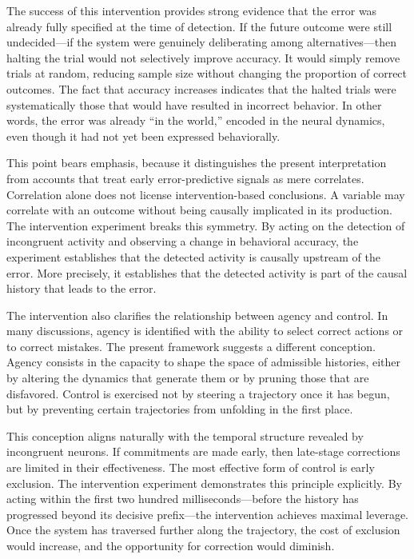 \documentclass[11pt]{article}
\begin{document}
The success of this intervention provides strong evidence that the error was already fully specified at the time of detection. If the future outcome were still undecided—if the system were genuinely deliberating among alternatives—then halting the trial would not selectively improve accuracy. It would simply remove trials at random, reducing sample size without changing the proportion of correct outcomes. The fact that accuracy increases indicates that the halted trials were systematically those that would have resulted in incorrect behavior. In other words, the error was already “in the world,” encoded in the neural dynamics, even though it had not yet been expressed behaviorally.

This point bears emphasis, because it distinguishes the present interpretation from accounts that treat early error-predictive signals as mere correlates. Correlation alone does not license intervention-based conclusions. A variable may correlate with an outcome without being causally implicated in its production. The intervention experiment breaks this symmetry. By acting on the detection of incongruent activity and observing a change in behavioral accuracy, the experiment establishes that the detected activity is causally upstream of the error. More precisely, it establishes that the detected activity is part of the causal history that leads to the error.

The intervention also clarifies the relationship between agency and control. In many discussions, agency is identified with the ability to select correct actions or to correct mistakes. The present framework suggests a different conception. Agency consists in the capacity to shape the space of admissible histories, either by altering the dynamics that generate them or by pruning those that are disfavored. Control is exercised not by steering a trajectory once it has begun, but by preventing certain trajectories from unfolding in the first place.

This conception aligns naturally with the temporal structure revealed by incongruent neurons. If commitments are made early, then late-stage corrections are limited in their effectiveness. The most effective form of control is early exclusion. The intervention experiment demonstrates this principle explicitly. By acting within the first two hundred milliseconds—before the history has progressed beyond its decisive prefix—the intervention achieves maximal leverage. Once the system has traversed further along the trajectory, the cost of exclusion would increase, and the opportunity for correction would diminish.
\end{document}
